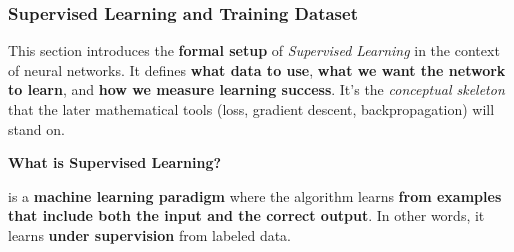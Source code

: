 \subsubsection{Supervised Learning and Training Dataset}

This section introduces the \textbf{formal setup} of \emph{Supervised Learning} in the context of neural networks. It defines \textbf{what data to use}, \textbf{what we want the network to learn}, and \textbf{how we measure learning success}. It's the \emph{conceptual skeleton} that the later mathematical tools (loss, gradient descent, backpropagation) will stand on.

\highspace
\begin{flushleft}
    \textcolor{Green3}{ \textbf{What is Supervised Learning?}}
\end{flushleft}
 is a \textbf{machine learning paradigm} where the algorithm learns \textbf{from examples that include both the input and the correct output}. In other words, it learns \textbf{under supervision} from labeled data.

